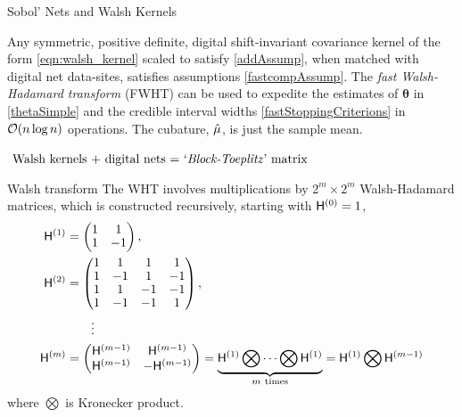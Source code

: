 \documentclass[handout, 10pt,compress,xcolor={usenames,dvipsnames}]{beamer} %
\newcommand{\bm}[1]{\boldsymbol{#1}}
\renewcommand{\vtheta}{{\bm{\theta}}}
\newcommand{\redroundmathbox}[1]{\parbox{\widthof{$#1$\hspace{1em}}}
	{\begin{mdframed}[style=redshade]\centering $#1$ \end{mdframed}}}
\begin{document}
\begin{frame}{Sobol' Nets and Walsh Kernels}
	
	\begin{theorem}
		Any symmetric, positive definite, digital shift-invariant covariance kernel of the form \eqref{eqn:walsh_kernel} scaled to satisfy \eqref{addAssump}, when matched with digital net data-sites, satisfies assumptions \eqref{fastcompAssump}.  The \emph{fast Walsh-Hadamard transform} (FWHT) can be used to expedite the estimates of $\vtheta$ in \eqref{thetaSimple} and the credible interval widths \eqref{fastStoppingCriterions} in $\operatorname{{\mathcal O}}(n \log n)$ operations. The cubature, $\hat{\mu}$, is just the sample mean.
	\end{theorem}
	
	\centering\redroundmathbox{\text{
			Walsh kernels + digital nets = `\emph{Block-Toeplitz}' matrix
	}}

\end{frame}




\begin{frame}{Walsh transform}
	The WHT involves multiplications by $2^m \times 2^m$ Walsh-Hadamard matrices, which is constructed recursively, starting with $\mathsf{H}^{(0)} = 1$,
	\begin{align}
	\nonumber
	\arraycolsep=1.4pt\def\arraystretch{0.9}
	\mH^{(1)} &=
	\begin{pmatrix}
	1 & 1 \\ 1 & -1
	\end{pmatrix}, \\
	\nonumber
	\mH^{(2)} &= 
	\begin{pmatrix}
	1 & 1 & 1 & 1 \\ 
	1 & -1 & 1 & -1 \\
	1 & 1 & -1 & -1 \\ 
	1 & -1 & -1 & 1 \\
	\end{pmatrix}, \\
	\nonumber
	& \qquad \vdots
	\\
	\label{eqn:hadamard_matrix}
	\mH^{(m)} &= 
	\begin{pmatrix}
	\mH^{(m-1)} & \mH^{(m-1)} \\ \mH^{(m-1)} & -\mH^{(m-1)}
	\end{pmatrix} 
	= \underbrace{\mH^{(1)} \bigotimes \cdots \bigotimes \mH^{(1)}}_{m \ \text{times}} 
	= \mH^{(1)} \bigotimes \mH^{(m-1)}
	\end{align}
	where $\bigotimes$ is Kronecker product.
\end{frame}
\end{document}
